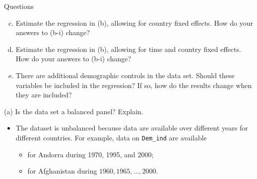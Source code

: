 \documentclass[
  10pt,
  ignorenonframetext,
]{beamer}
\providecommand{\tightlist}{%
  \setlength{\itemsep}{0pt}\setlength{\parskip}{0pt}}
\begin{document}
\begin{frame}{Questions}
\protect\hypertarget{questions-3}{}
\begin{enumerate}
[(a)]
\setcounter{enumi}{2}
\tightlist
\item
  Estimate the regression in (b), allowing for country fixed effects.
  How do your answers to (b-i) change?
\end{enumerate}

\vspace{3mm}

\begin{enumerate}
[(a)]
\setcounter{enumi}{3}
\tightlist
\item
  Estimate the regression in (b), allowing for time and country fixed
  effects. How do your answers to (b-i) change?
\end{enumerate}

\vspace{3mm}

\begin{enumerate}
[(a)]
\setcounter{enumi}{4}
\tightlist
\item
  There are additional demographic controls in the data set. Should
  these variables be included in the regression? If so, how do the
  results change when they are included?
\end{enumerate}
\end{frame}

\begin{frame}[fragile]{(a) Is the data set a balanced panel? Explain.}
\protect\hypertarget{a-is-the-data-set-a-balanced-panel-explain.}{}
\begin{itemize}
\tightlist
\item
  The dataset is unbalanced because data are available over different
  years for different countries. For example, data on \texttt{Dem\_ind}
  are available \vspace{0.8mm}

  \begin{itemize}
  \tightlist
  \item
    for Andorra during 1970, 1995, and 2000;
  \item
    for Afghanistan during \(1960, 1965, \ldots, 2000\).
  \end{itemize}
\end{itemize}
\end{frame}
\end{document}
